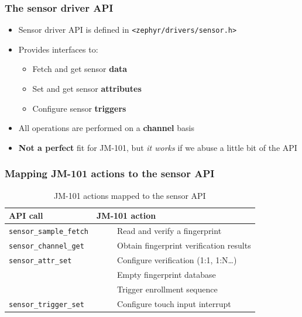 \documentclass[handout]{beamer}
\newcommand{\tabitem}{~~\llap{\textbullet}~~}
\begin{document}
\begin{frame}
  \frametitle{The sensor driver API}

  \begin{itemize}
    \item Sensor driver API is defined in \texttt{<zephyr/drivers/sensor.h>}
    \item Provides interfaces to:
          \begin{itemize}
            \item Fetch and get sensor \textbf{data}
            \item Set and get sensor \textbf{attributes}
            \item Configure sensor \textbf{triggers}
          \end{itemize}
    \item All operations are performed on a \textbf{channel} basis
    \item \textbf{Not a perfect} fit for JM-101, but \textit{it works} if we
          abuse a little bit of the API
  \end{itemize}
\end{frame}

\begin{frame}
  \frametitle{Mapping JM-101 actions to the sensor API}

  \begin{table}
    \centering
    \footnotesize
    \begin{tabular}{ll}
      \toprule
      API call                       & JM-101 action                                    \\
      \midrule
      \texttt{sensor\_sample\_fetch} & \tabitem~Read and verify a fingerprint           \\
      \midrule
      \texttt{sensor\_channel\_get}  & \tabitem~Obtain fingerprint verification results \\
      \midrule
      \texttt{sensor\_attr\_set}     & \tabitem~Configure verification (1:1, 1:N\ldots) \\
                                     & \tabitem~Empty fingerprint database              \\
                                     & \tabitem~Trigger enrollment sequence             \\
      \midrule
      \texttt{sensor\_trigger\_set}  & \tabitem~Configure touch input interrupt         \\
      \bottomrule
    \end{tabular}
    \caption{JM-101 actions mapped to the sensor API}
  \end{table}
\end{frame}
\end{document}

